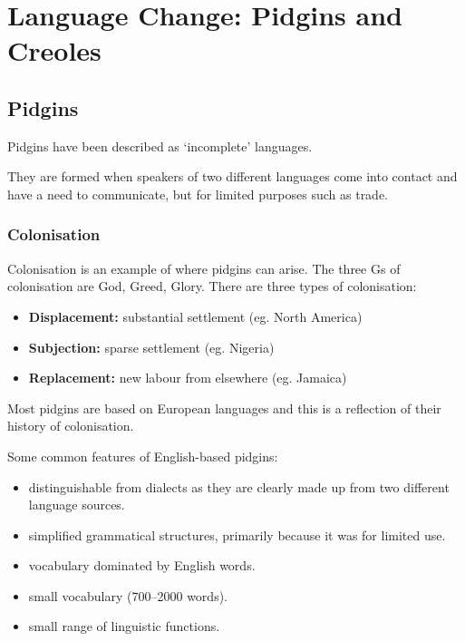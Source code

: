 \documentclass[../main.tex]{subfiles}
\begin{document}
    \section{Language Change: Pidgins and Creoles}

    \subsection{Pidgins}
    Pidgins have been described as `incomplete' languages. \par
    They are formed when speakers of two different languages come into contact and have a need to communicate, but for limited purposes such as trade. \par

    \subsubsection{Colonisation}
    Colonisation is an example of where pidgins can arise. The three Gs of colonisation are God, Greed, Glory. There are three types of colonisation: 
    \begin{itemize}
        \item \textbf{Displacement:} substantial settlement (eg. North America)
        \item \textbf{Subjection:} sparse settlement (eg. Nigeria)
        \item \textbf{Replacement:} new labour from elsewhere (eg. Jamaica)
    \end{itemize}
    Most pidgins are based on European languages and this is a reflection of their history of colonisation.


    Some common features of English-based pidgins:
    \begin{itemize}
        \item distinguishable from dialects as they are clearly made up from two different language sources.
        \item simplified grammatical structures, primarily because it was for limited use.
        \item vocabulary dominated by English words.
        \item small vocabulary (700--2000 words).
        \item small range of linguistic functions.
    \end{itemize}
\end{document}

